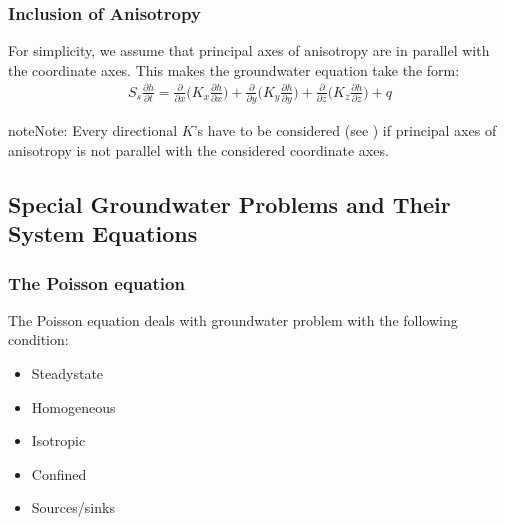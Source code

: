 \documentclass[letterpaper,10pt,english]{jupyterBook}
\begin{document}
\subsubsection{Inclusion of Anisotropy}
\label{\detokenize{content/flow/L7/17_quantify_flow:inclusion-of-anisotropy}}
\sphinxAtStartPar
For simplicity, we assume that principal axes of anisotropy are in parallel with the coordinate axes. This makes the groundwater equation take the form:
\begin{equation*}
\begin{split}
S_s\frac{\partial h}{\partial t} = \frac{\partial }{\partial x} \bigg(K_x \frac{\partial h}{\partial x}\bigg) + \frac{\partial}{\partial y} \bigg(K_y \frac{\partial h}{\partial y}\bigg) + \frac{\partial }{\partial z}\bigg(K_z \frac{\partial h}{\partial z} \bigg) + q
\end{split}
\end{equation*}
\begin{sphinxadmonition}{note}{Note:}
\sphinxAtStartPar
Every directional \(K\)’s have to be considered (see {\hyperref[\detokenize{content/flow/L6/16_darcy_law_3D::doc}]{}}) if principal axes of anisotropy is not parallel with the considered coordinate axes.
\end{sphinxadmonition}


\subsection{Special Groundwater Problems and Their System Equations}
\label{\detokenize{content/flow/L7/17_quantify_flow:special-groundwater-problems-and-their-system-equations}}

\subsubsection{The Poisson equation}
\label{\detokenize{content/flow/L7/17_quantify_flow:the-poisson-equation}}
\sphinxAtStartPar
The Poisson equation deals with groundwater problem with the following condition:
\begin{itemize}
\item {} 
\sphinxAtStartPar
Steady\sphinxhyphen{}state

\item {} 
\sphinxAtStartPar
Homogeneous

\item {} 
\sphinxAtStartPar
Isotropic

\item {} 
\sphinxAtStartPar
Confined

\item {} 
\sphinxAtStartPar
Sources/sinks

\end{itemize}
\end{document}

